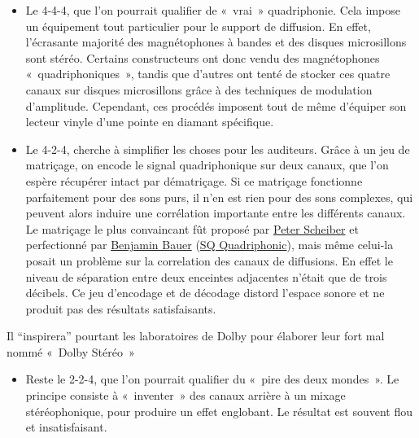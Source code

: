 \documentclass[
  letterpaper,
  DIV=11,
  numbers=noendperiod]{scrreprt}
\providecommand{\tightlist}{%
  \setlength{\itemsep}{0pt}\setlength{\parskip}{0pt}}\usepackage{longtable,booktabs,array}
\begin{document}
\begin{itemize}
\item
  Le 4-4-4, que l'on pourrait qualifier de «~vrai~» quadriphonie. Cela
  impose un équipement tout particulier pour le support de diffusion. En
  effet, l'écrasante majorité des magnétophones à bandes et des disques
  microsillons sont stéréo. Certains constructeurs ont donc vendu des
  magnétophones «~quadriphoniques~», tandis que d'autres ont tenté de
  stocker ces quatre canaux sur disques microsillons grâce à des
  techniques de modulation d'amplitude. Cependant, ces procédés imposent
  tout de même d'équiper son lecteur vinyle d'une pointe en diamant
  spécifique.
\item
  Le 4-2-4, cherche à simplifier les choses pour les auditeurs. Grâce à
  un jeu de matriçage, on encode le signal quadriphonique sur deux
  canaux, que l'on espère récupérer intact par dématriçage. Si ce
  matriçage fonctionne parfaitement pour des sons purs, il n'en est rien
  pour des sons complexes, qui peuvent alors induire une corrélation
  importante entre les différents canaux. Le matriçage le plus
  convaincant fût proposé par
  \href{https://en.wikipedia.org/wiki/Peter_Scheiber}{Peter Scheiber} et
  perfectionné par
  \href{https://en.wikipedia.org/wiki/Benjamin_Bauer}{Benjamin Bauer}
  (\href{https://en.wikipedia.org/wiki/Stereo_Quadraphonic}{SQ
  Quadriphonic}), mais même celui-la posait un problème sur la
  correlation des canaux de diffusions. En effet le niveau de séparation
  entre deux enceintes adjacentes n'était que de trois décibels. Ce jeu
  d'encodage et de décodage distord l'espace sonore et ne produit pas
  des résultats satisfaisants.
\end{itemize}

\begin{tcolorbox}[enhanced jigsaw, leftrule=.75mm, arc=.35mm, bottomtitle=1mm, colback=white, colbacktitle=quarto-callout-note-color!10!white, opacityback=0, left=2mm, rightrule=.15mm, opacitybacktitle=0.6, breakable, toptitle=1mm, titlerule=0mm, bottomrule=.15mm, toprule=.15mm, coltitle=black, title=\textcolor{quarto-callout-note-color}{\faInfo}\hspace{0.5em}{Note}]

Il ``inspirera'' pourtant les laboratoires de Dolby pour élaborer leur
fort mal nommé «~Dolby Stéréo~»

\end{tcolorbox}

\begin{itemize}
\tightlist
\item
  Reste le 2-2-4, que l'on pourrait qualifier du «~pire des deux
  mondes~». Le principe consiste à «~inventer~» des canaux arrière à un
  mixage stéréophonique, pour produire un effet englobant. Le résultat
  est souvent flou et insatisfaisant.
\end{itemize}
\end{document}

